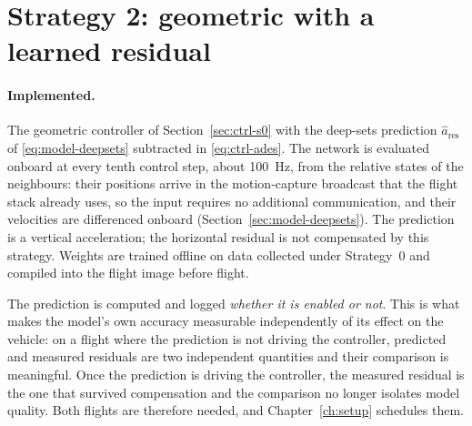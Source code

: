 \section{Strategy 2: geometric with a learned residual}
\label{sec:ctrl-s2}

\paragraph{Implemented.} The geometric controller of Section~\ref{sec:ctrl-s0} with the deep-sets
prediction $\hat{a}_{\mathrm{res}}$ of \eqref{eq:model-deepsets} subtracted in
\eqref{eq:ctrl-ades}. The network is evaluated onboard at every tenth control step, about
\SI{100}{\hertz}, from the relative states of the neighbours: their positions arrive in the
motion-capture broadcast that the flight stack already uses, so the input requires no additional
communication, and their velocities are differenced onboard (Section~\ref{sec:model-deepsets}).
The prediction is a vertical acceleration; the horizontal residual is not compensated by this
strategy. Weights are trained offline on data collected under Strategy~0 and compiled into the
flight image before flight.

The prediction is computed and logged \emph{whether it is enabled or not}. This is what makes the
model's own accuracy measurable independently of its effect on the vehicle: on a flight where the
prediction is not driving the controller, predicted and measured residuals are two independent
quantities and their comparison is meaningful. Once the prediction is driving the controller, the
measured residual is the one that survived compensation and the comparison no longer isolates model
quality. Both flights are therefore needed, and Chapter~\ref{ch:setup} schedules them.

